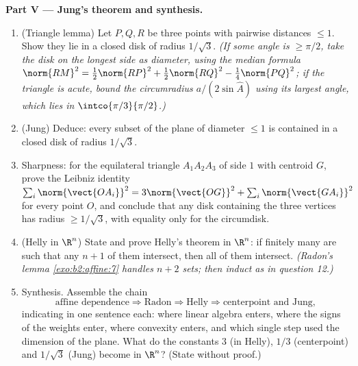 \begin{problem}
\medskip
\noindent\textbf{Part V --- Jung's theorem and synthesis.}
\begin{enumerate}[resume]
  \item (Triangle lemma) Let $P, Q, R$ be three points with
        pairwise distances $\leq 1$. Show they lie in a
        closed disk of radius $1/\sqrt3$. \emph{(If some
        angle is $\geq \pi/2$, take the disk on the longest
        side as diameter, using the median formula
        $\norm{RM}^2 = \tfrac12\norm{RP}^2 +
        \tfrac12\norm{RQ}^2 - \tfrac14\norm{PQ}^2$; if the
        triangle is acute, bound the circumradius $a/(2\sin
        \widehat A)$ using its largest angle, which lies in
        $\intco{\pi/3}{\pi/2}$.)}
  \item (Jung) Deduce: every  subset of the plane of
        diameter $\leq 1$ is contained in a closed disk of
        radius $1/\sqrt3$.
  \item Sharpness: for the equilateral triangle $A_1A_2A_3$
        of side $1$ with centroid $G$, prove the Leibniz
        identity $\sum_i \norm{\vect{OA_i}}^2 =
        3\norm{\vect{OG}}^2 + \sum_i \norm{\vect{GA_i}}^2$
        for every point $O$, and conclude that any disk
        containing the three vertices has radius $\geq
        1/\sqrt3$, with equality only for the circumdisk.
  \item (Helly in $\R^n$) State and prove Helly's theorem in
        $\R^n$: if finitely many  are such that
        any $n + 1$ of them intersect, then all of them
        intersect. \emph{(Radon's lemma
        \cref{exo:b2:affine:7} handles $n + 2$ sets; then
        induct as in question 12.)}
  \item Synthesis. Assemble the chain
        \[
        \text{affine dependence} \Rightarrow \text{Radon}
        \Rightarrow \text{Helly} \Rightarrow
        \text{centerpoint and Jung},
        \]
        indicating in one sentence each: where linear algebra
        enters, where the signs of the weights enter, where
        convexity enters, and which single step used the
        dimension of the plane. What do the constants $3$ (in
        Helly), $1/3$ (centerpoint) and $1/\sqrt3$ (Jung)
        become in $\R^n$? (State without proof.)
\end{enumerate}
\end{problem}

